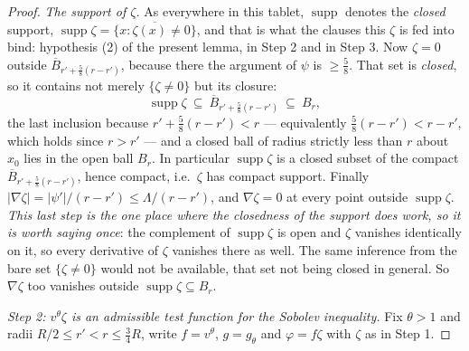 \begin{proof}
\emph{The support of $\zeta$.}  As everywhere in this tablet,
$\operatorname{supp}$ denotes the \emph{closed} support, $\operatorname{supp}
\zeta=\overline{\{x:\zeta(x)\ne0\}}$, and that is what the clauses this $\zeta$
is fed into bind: hypothesis (2) of the present lemma,
 in Step 2 and 
in Step 3.  Now $\zeta=0$ outside $\overline B_{r'+\frac58(r-r')}$, because
there the argument of $\psi$ is $\ge\tfrac58$.  That set is \emph{closed}, so it
contains not merely $\{\zeta\ne0\}$ but its closure:
\[
\operatorname{supp}\zeta\ \subseteq\ \overline B_{r'+\frac58(r-r')}\ \subseteq\ B_r ,
\]
the last inclusion because $r'+\tfrac58(r-r')<r$ --- equivalently
$\tfrac58(r-r')<r-r'$, which holds since $r>r'$ --- and a closed ball of radius
strictly less than $r$ about $x_0$ lies in the open ball $B_r$.  In particular
$\operatorname{supp}\zeta$ is a closed subset of the compact
$\overline B_{r'+\frac58(r-r')}$, hence compact, i.e.\ $\zeta$ has compact
support.  Finally
$|\nabla\zeta|=|\psi'|/(r-r')\le\Lambda/(r-r')$, and $\nabla\zeta=0$ at every
point outside $\operatorname{supp}\zeta$.  \emph{This last step is the one place
where the closedness of the support does work, so it is worth saying once}: the
complement of $\operatorname{supp}\zeta$ is open and $\zeta$ vanishes
identically on it, so every derivative of $\zeta$ vanishes there as well.  The
same inference from the bare set $\{\zeta\ne0\}$ would not be available, that
set not being closed in general.  So $\nabla\zeta$ too vanishes outside
$\operatorname{supp}\zeta\subseteq B_r$.

\emph{Step 2: $v^\theta\zeta$ is an admissible test function for the Sobolev
inequality.}  Fix $\theta>1$ and radii $R/2\le r'<r\le\frac34R$, write
$f=v^\theta$, $g=g_\theta$ and $\varphi=f\zeta$ with $\zeta$ as in Step 1.


\end{proof}
